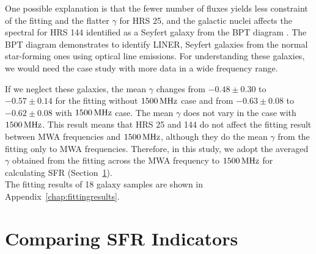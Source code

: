 One possible explanation is that the fewer number of fluxes yields less constraint of the fitting and the flatter $\gamma$ for HRS 25, and the galactic nuclei affects the spectral for HRS 144 identified as a Seyfert galaxy from the BPT diagram \citep[e.g.,][]{Baldwin1981, Kewley2001, Kauffmann2003, Schawinski2007}.
The BPT diagram demonstrates to identify LINER, Seyfert galaxies from the normal star-forming ones using optical line emissions.
For understanding these galaxies, we would need the case study with more data in a wide frequency range.

If we neglect these galaxies, the mean $\gamma$ changes from $-0.48\pm0.30$ to $-0.57\pm0.14$ for the fitting without $1500\,\mathrm{MHz}$ case and from $-0.63\pm0.08$ to $-0.62\pm0.08$ with $1500\,\mathrm{MHz}$ case.
The mean $\gamma$ does not vary in the case with $1500\,\mathrm{MHz}$.
This result means that HRS 25 and 144 do not affect the fitting result between MWA frequencies and $1500\,\mathrm{MHz}$, although they do the mean $\gamma$ from the fitting only to MWA frequencies.
Therefore, in this study, we adopt the averaged $\gamma$ obtained from the fitting across the MWA frequency to $1500\,\mathrm{MHz}$ for calculating SFR (Section~\ref{sec:sfrfromlowradio}).\\
The fitting results of 18 galaxy samples are shown in Appendix~\ref{chap:fittingresults}.



\section{Comparing SFR Indicators}\label{sec:sfrfromlowradio}

